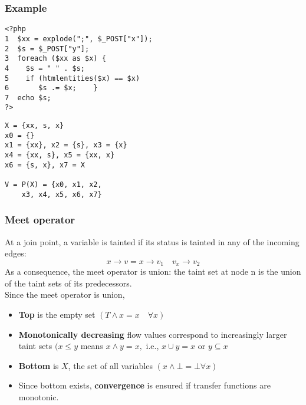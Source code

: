 \documentclass[a4paper, 10pt, titlepage]{article}
\begin{document}
\subsubsection*{Example}
\begin{minipage}{0.5\textwidth}
\begin{small}
\begin{lstlisting}
<?php 
1  $xx = explode(";", $_POST["x"]); 
2  $s = $_POST["y"]; 
3  foreach ($xx as $x) { 
4    $s = " " . $s; 
5    if (htmlentities($x) == $x) 
6       $s .= $x;    } 
7  echo $s; 
?>
\end{lstlisting}
\end{small}
\end{minipage}
\hfill\vline\hfill
\begin{minipage}{0.4\textwidth}
\begin{small}
\begin{lstlisting}
X = {xx, s, x} 
x0 = {} 
x1 = {xx}, x2 = {s}, x3 = {x} 
x4 = {xx, s}, x5 = {xx, x} 
x6 = {s, x}, x7 = X 

V = P(X) = {x0, x1, x2, 
	x3, x4,	x5, x6, x7}
\end{lstlisting}
\end{small}
\end{minipage}
\subsubsection*{Meet operator}
At a join point, a variable is tainted if its status is tainted in any of the incoming edges: 
$$x \rightarrow v = x \rightarrow v_1 \quad v_x \rightarrow v_2$$
As a consequence, the meet operator is union: the taint set at node n is the union of the taint sets of its predecessors. \medskip \\
Since the meet operator is union,
\begin{itemize}
\item \textbf{Top} is the empty set $(T \wedge x = x \quad \forall x)$
\item \textbf{Monotonically decreasing} flow values correspond to increasingly larger taint sets $(x \leq y$ means $x \wedge y = x,$ i.e., $x \cup y = x$ or $y \subseteq x$
\item \textbf{Bottom} is $X$, the set of all variables $(x \wedge \bot = \bot \forall x)$
\item Since bottom exists, \textbf{convergence} is ensured if transfer functions are monotonic.
\end{itemize}
\end{document}
